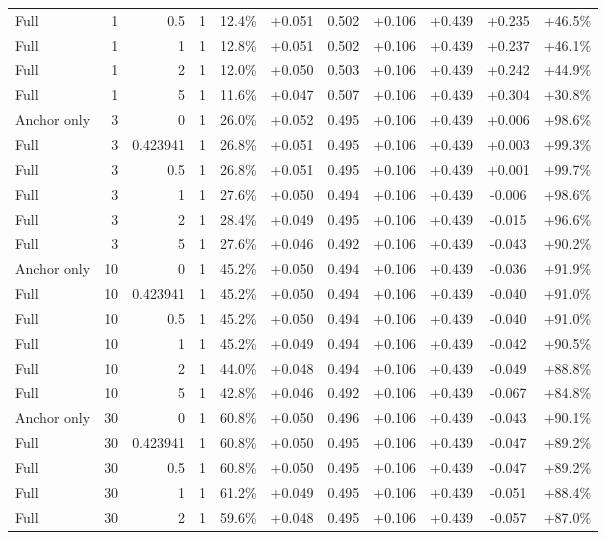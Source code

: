 \begin{table}[htbp]
\begin{tabular}{lrrrccccccc}
Full & 1 & 0.5 & 1 & 12.4\% & +0.051 & 0.502 & +0.106 & +0.439 & +0.235 & +46.5\% \\
Full & 1 & 1 & 1 & 12.8\% & +0.051 & 0.502 & +0.106 & +0.439 & +0.237 & +46.1\% \\
Full & 1 & 2 & 1 & 12.0\% & +0.050 & 0.503 & +0.106 & +0.439 & +0.242 & +44.9\% \\
Full & 1 & 5 & 1 & 11.6\% & +0.047 & 0.507 & +0.106 & +0.439 & +0.304 & +30.8\% \\
Anchor only & 3 & 0 & 1 & 26.0\% & +0.052 & 0.495 & +0.106 & +0.439 & +0.006 & +98.6\% \\
Full & 3 & 0.423941 & 1 & 26.8\% & +0.051 & 0.495 & +0.106 & +0.439 & +0.003 & +99.3\% \\
Full & 3 & 0.5 & 1 & 26.8\% & +0.051 & 0.495 & +0.106 & +0.439 & +0.001 & +99.7\% \\
Full & 3 & 1 & 1 & 27.6\% & +0.050 & 0.494 & +0.106 & +0.439 & -0.006 & +98.6\% \\
Full & 3 & 2 & 1 & 28.4\% & +0.049 & 0.495 & +0.106 & +0.439 & -0.015 & +96.6\% \\
Full & 3 & 5 & 1 & 27.6\% & +0.046 & 0.492 & +0.106 & +0.439 & -0.043 & +90.2\% \\
Anchor only & 10 & 0 & 1 & 45.2\% & +0.050 & 0.494 & +0.106 & +0.439 & -0.036 & +91.9\% \\
Full & 10 & 0.423941 & 1 & 45.2\% & +0.050 & 0.494 & +0.106 & +0.439 & -0.040 & +91.0\% \\
Full & 10 & 0.5 & 1 & 45.2\% & +0.050 & 0.494 & +0.106 & +0.439 & -0.040 & +91.0\% \\
Full & 10 & 1 & 1 & 45.2\% & +0.049 & 0.494 & +0.106 & +0.439 & -0.042 & +90.5\% \\
Full & 10 & 2 & 1 & 44.0\% & +0.048 & 0.494 & +0.106 & +0.439 & -0.049 & +88.8\% \\
Full & 10 & 5 & 1 & 42.8\% & +0.046 & 0.492 & +0.106 & +0.439 & -0.067 & +84.8\% \\
Anchor only & 30 & 0 & 1 & 60.8\% & +0.050 & 0.496 & +0.106 & +0.439 & -0.043 & +90.1\% \\
Full & 30 & 0.423941 & 1 & 60.8\% & +0.050 & 0.495 & +0.106 & +0.439 & -0.047 & +89.2\% \\
Full & 30 & 0.5 & 1 & 60.8\% & +0.050 & 0.495 & +0.106 & +0.439 & -0.047 & +89.2\% \\
Full & 30 & 1 & 1 & 61.2\% & +0.049 & 0.495 & +0.106 & +0.439 & -0.051 & +88.4\% \\
Full & 30 & 2 & 1 & 59.6\% & +0.048 & 0.495 & +0.106 & +0.439 & -0.057 & +87.0\% \\

\end{tabular}
\end{table}
